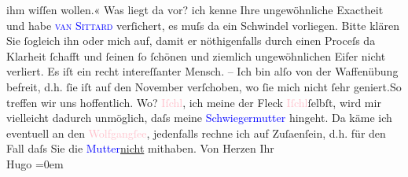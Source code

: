                ihm wiſſen {\pb}wollen.« Was liegt da
               vor? ich kenne Ihre ungewöhnliche Exactheit und habe \textcolor{blue}{\textsc{van Sittard}}{}\ledrightnote{\textcolor{blue}{Robert Gilbert Vansittart}} verſichert, es muſs da ein
               Schwindel vorliegen. Bitte klären Sie ſogleich ihn oder mich auf, damit er
               nöthigenfalls durch einen Proceſs da Klarheit ſchafft und ſeinen ſo ſchönen und
               ziemlich ungewöhnlichen Eifer nicht verliert. Es iſt ein recht intereſſanter
               Mensch.\pend
           \pstart
           \centering{}{\pb}–\pend
           \pstart
           \noindent{}Ich bin alſo von der Waffenübung befreit, d.h. ſie iſt auf den November
               verſchoben, wo ſie mich nicht ſehr geniert.\hspace*{1.5em}So
               treffen wir uns hoffentlich. Wo? \textcolor{pink}{Iſchl}{}\ledrightnote{\textcolor{pink}{Bad Ischl}}, ich meine
               der Fleck \textcolor{pink}{Iſchl}{}\ledrightnote{\textcolor{pink}{Bad Ischl}}{ }ſelbſt, wird mir vielleicht dadurch unmöglich, daſs
               meine \textcolor{blue}{Schwiegermutter}{} hingeht.
               Da käme ich eventuell an den \textcolor{pink}{Wolfgangſee}{}\ledrightnote{\textcolor{pink}{Wolfgangsee}},
               jedenfalls rechne ich auf Zuſa{\geminationm}enſein, d.h. für den Fall
               daſs Sie die \textcolor{blue}{Mutter}{}\uline{nicht} mithaben.\pend
           \pstart
           Von Herzen Ihr{\\[\baselineskip]}\spacefill\mbox{Hugo}\pend
           \leftskip=0em{}\endnumbering{}  
      